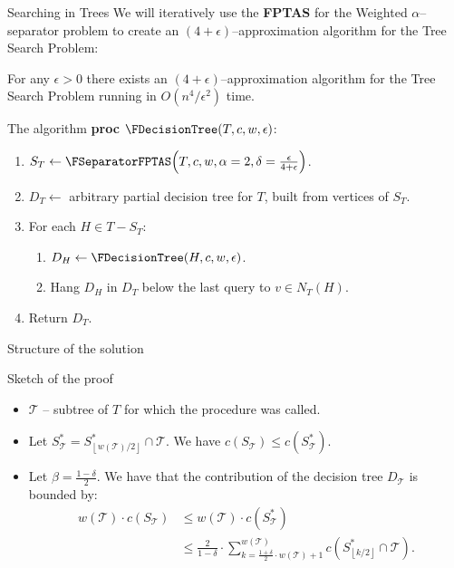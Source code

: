 \documentclass{beamer}
\newcommand{\br}[1]{\mathopen{}\left( #1 \right)}
\newcommand{\fl}[1]{\mathopen{}\left\lfloor #1 \right\rfloor}
\begin{document}
\begin{frame}{Searching in Trees}
We will iteratively use the \textbf{FPTAS} for the Weighted $\alpha$–separator problem to create an $\br{4+\epsilon}$–approximation algorithm for the Tree Search Problem:
\pause
\begin{theorem}
    For any $\epsilon>0$ there exists an $\br{4+\epsilon}$–approximation algorithm for the Tree Search Problem running in $O\br{n^4/\epsilon^2}$ time.
\end{theorem}
    
\end{frame}

\begin{frame}{The algorithm}
\textbf{proc} $\FDecisionTree\br{T,c,w,\epsilon}$:
\begin{enumerate}
    \item $S_T\gets\FSeparatorFPTAS\br{T, c, w, \alpha=2, \delta = \frac{\epsilon}{4+\epsilon}}$.
    \item $D_T\gets$ arbitrary partial decision tree for $T$, built from vertices of $S_T$.
    \item For each $H\in T-S_T$:
    \begin{enumerate}
        \item $D_H\gets\FDecisionTree\br{H,c,w,\epsilon}$.
        \item Hang $D_H$ in $D_T$ below the last query to $v\in N_T\br{H}$.
    \end{enumerate}
    \item Return $D_T$.
\end{enumerate}
\end{frame}

\begin{frame}{Structure of the solution}

\end{frame}

%     

\begin{frame}{Sketch of the proof}
\begin{itemize}
    \item $\mathcal{T}$ – subtree of $T$ for which the procedure was called.
    \pause
    \item Let $S_{\mathcal{T}}^*=S_{\fl{w\br{\mathcal{T}}/2}}^*\cap\mathcal{T}$. We have $c\br{S_{\mathcal{T}}}\leq c\br{S_{\mathcal{T}}^*}$.
    \pause
    \item Let $\beta=\frac{1-\delta}{2}$. We have that the contribution of the decision tree $D_{\mathcal{T}}$ is bounded by:
    \pause
            \begin{align*}
                w\br{\mathcal{T}}\cdot c\br{S_{\mathcal{T}}}
                &\leq w\br{\mathcal{T}}\cdot c\br{S_{\mathcal{T}}^*} 
                \\&\leq 
                \frac{2}{1-\delta}\cdot \sum_{k=\frac{1+\delta}{2}\cdot w\br{\mathcal{T}}+1}^{w\br{\mathcal{T}}}c\br{S_{\fl{k/2}}^*\cap \mathcal{T}}.
            \end{align*}
    \end{itemize} 
\end{frame}
\end{document}
